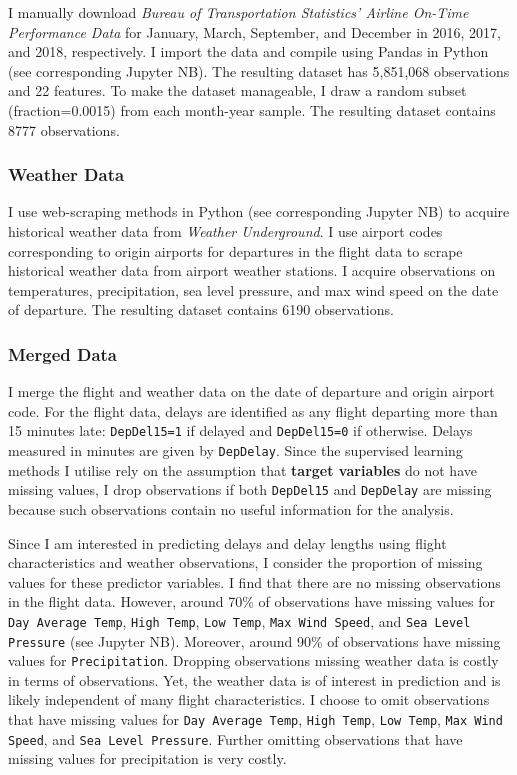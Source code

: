 \documentclass[
]{article}
\begin{document}
I manually download
\textit{Bureau of Transportation Statistics' Airline On-Time Performance Data}
for January, March, September, and December in 2016, 2017, and 2018,
respectively. I import the data and compile using Pandas in Python (see
corresponding Jupyter NB). The resulting dataset has 5,851,068
observations and 22 features. To make the dataset manageable, I draw a
random subset (fraction=0.0015) from each month-year sample. The
resulting dataset contains 8777 observations.

\subsubsection{Weather Data}

I use web-scraping methods in Python (see corresponding Jupyter NB) to
acquire historical weather data from \textit{Weather Underground}. I use
airport codes corresponding to origin airports for departures in the
flight data to scrape historical weather data from airport weather
stations. I acquire observations on temperatures, precipitation, sea
level pressure, and max wind speed on the date of departure. The
resulting dataset contains 6190 observations.

\subsubsection{Merged Data}

I merge the flight and weather data on the date of departure and origin
airport code. For the flight data, delays are identified as any flight
departing more than 15 minutes late: \texttt{DepDel15=1} if delayed and
\texttt{DepDel15=0} if otherwise. Delays measured in minutes are given
by \texttt{DepDelay}. Since the supervised learning methods I utilise
rely on the assumption that \textbf{target variables} do not have
missing values, I drop observations if both \texttt{DepDel15} and
\texttt{DepDelay} are missing because such observations contain no
useful information for the analysis.

Since I am interested in predicting delays and delay lengths using
flight characteristics and weather observations, I consider the
proportion of missing values for these predictor variables. I find that
there are no missing observations in the flight data. However, around
70\% of observations have missing values for \texttt{Day Average Temp},
\texttt{High Temp}, \texttt{Low Temp}, \texttt{Max Wind Speed}, and
\texttt{Sea Level Pressure} (see Jupyter NB). Moreover, around 90\% of
observations have missing values for \texttt{Precipitation}. Dropping
observations missing weather data is costly in terms of observations.
Yet, the weather data is of interest in prediction and is likely
independent of many flight characteristics. I choose to omit
observations that have missing values for \texttt{Day Average Temp},
\texttt{High Temp}, \texttt{Low Temp}, \texttt{Max Wind Speed}, and
\texttt{Sea Level Pressure}. Further omitting observations that have
missing values for precipitation is very costly.
\end{document}
